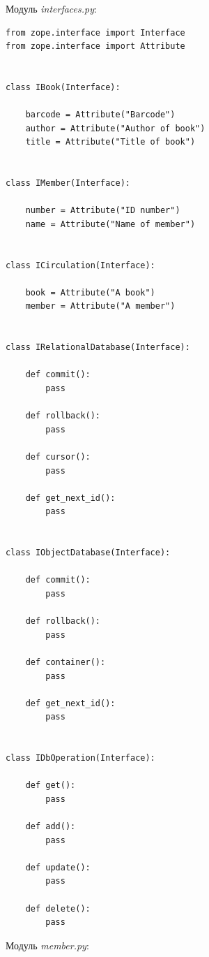 \documentclass[a4paper,openany,twoside,final]{book}
\providecommand*{\DUroletitlereference}[1]{\textsl{#1}}
\begin{document}
Модуль \DUroletitlereference{interfaces.py}:

\begin{verbatim}
from zope.interface import Interface
from zope.interface import Attribute


class IBook(Interface):

    barcode = Attribute("Barcode")
    author = Attribute("Author of book")
    title = Attribute("Title of book")


class IMember(Interface):

    number = Attribute("ID number")
    name = Attribute("Name of member")


class ICirculation(Interface):

    book = Attribute("A book")
    member = Attribute("A member")


class IRelationalDatabase(Interface):

    def commit():
        pass

    def rollback():
        pass

    def cursor():
        pass

    def get_next_id():
        pass


class IObjectDatabase(Interface):

    def commit():
        pass

    def rollback():
        pass

    def container():
        pass

    def get_next_id():
        pass


class IDbOperation(Interface):

    def get():
        pass

    def add():
        pass

    def update():
        pass

    def delete():
        pass
\end{verbatim}

Модуль \DUroletitlereference{member.py}:
\end{document}
